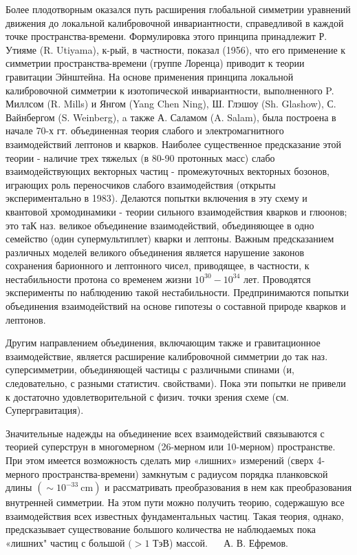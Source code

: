 \documentclass[10pt]{article}
\begin{document}
Более плодотворным оказался путь расширения глобальной симметрии уравнений движения до локальной калибровочной инвариантности, справедливой в каждой точке пространства-времени. Формулировка этого принципа принадлежит Р. Утияме (R. Utiyama), к-рый, в частности, показал (1956), что его применение к симметрии пространства-времени (группе Лоренца) приводит к теории гравитации Эйнштейна. На основе применения принципа локальной калибровочной симметрии к изотопической инвариантности, выполненного P. Миллсом (R. Mills) и Янгом (Yang Chen Ning), Ш. Глэшоу (Sh. Glashow), С. Вайнбергом (S. Weinberg), a также А. Саламом (A. Salam), была построена в начале 70-х гт. объединенная теория слабого и электромагнитного взаимодействий лептонов и кварков. Наиболее существенное предсказание этой теории - наличие трех тяжелых (в 80-90 протонных масс) слабо взаимодействующих векторных частиц - промежуточных векторных бозонов, играющих роль переносчиков слабого взаимодействия (открыты экспериментально в 1983). Делаются попытки включения в эту схему и квантовой хромодинамики - теории сильного взаимодействия кварков и глюонов; это таК наз. великое объединение взаимодействий, объединяющее в одно семейство (один супермультиплет) кварки и лептоны. Важным предсказанием различных моделей великого объединения является нарушение законов сохранения барионного и лептонного чисел, приводящее, в частности, к нестабильности протона со временем жизни $10^{30}-10^{34}$ лет. Проводятся эксперименты по наблюдению такой нестабильности. Предпринимаются попытки объединения взаимодействий на основе гипотезы о составной природе кварков и лептонов.



Другим направлением объединения, включающим также и гравитационное взаимодействие, является расширение калибровочной симметрии до так наз. суперсимметрии, объединяющей частицы с различными спинами (и, следовательно, с разными статистич. свойствами). Пока эти попытки не привели к достаточно удовлетворительной с физич. точки зрения схеме (см. Супергравитация).



Значительные надежды на объединение всех взаимодействий связываются с теорией суперструн в многомерном (26-мерном или 10-мерном) пространстве. При этом имеется возможность сделать мир «лишних» измерений (сверх 4-мерного пространства-времени) замкнутым с радиусом порядка планковской длины $\left(\sim 10^{-33} \mathrm{~cm}\right)$ и рассматривать преобразования в нем как преобразования внутренней симметрии. На этом пути можно получить теорию, содержашую все взаимодействия всех известных фундаментальных частиц. Такая теория, однако, предсказывает существование большого количества не наблюдаемых пока «лишних" частиц с большой $(>1$ ТэВ) массой. $\quad$ А. В. Ефремов.
\end{document}
